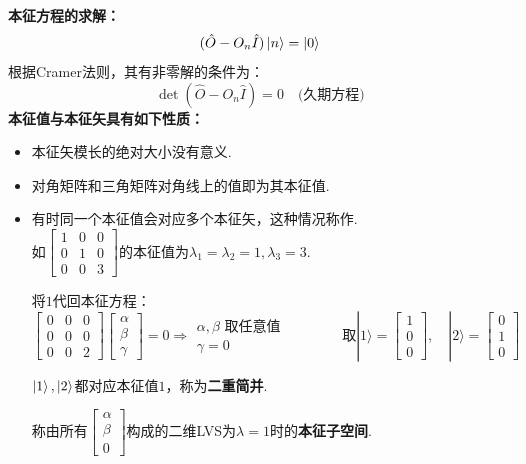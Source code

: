\noindent\textbf{本征方程的求解：}
\[(\hat{O}-O_n \hat{I}) \ket{n} = \ket{0}\]
根据Cramer法则，其有非零解的条件为：
\[\det(\hat{O}-O_n \hat{I})=0 \quad \text{(久期方程)}\]
\noindent\textbf{本征值与本征矢具有如下性质：}
\begin{itemize}
    \item 本征矢模长的绝对大小没有意义.
    \item 对角矩阵和三角矩阵对角线上的值即为其本征值.
    \item 有时同一个本征值会对应多个本征矢，这种情况称作.\\[1em]
    如$\begin{bmatrix} 1 & 0 & 0 \\ 0 & 1 & 0 \\ 0 & 0 & 3 \end{bmatrix}$的本征值为$\lambda_1 = \lambda_2 = 1, \lambda_3 = 3$.

    将$1$代回本征方程：
    \[
    \begin{bmatrix} 0 & 0 & 0 \\ 0 & 0 & 0 \\ 0 & 0 & 2 \end{bmatrix} \begin{bmatrix} \alpha \\ \beta \\ \gamma \end{bmatrix} = 0 \Rightarrow \begin{matrix} \alpha, \beta \text{ 取任意值} \\ \gamma = 0 \end{matrix}
    \qquad\qquad \text{取} |1\rangle = \begin{bmatrix} 1 \\ 0 \\ 0 \end{bmatrix}, \quad |2\rangle = \begin{bmatrix} 0 \\ 1 \\ 0 \end{bmatrix}
    \]

    $\ket{1},\ket{2}$都对应本征值$1$，称为\textbf{二重简并}.

    称由所有$\begin{bmatrix} \alpha \\ \beta \\ 0 \end{bmatrix}$构成的二维LVS为$\lambda = 1$时的\textbf{本征子空间}.
\end{itemize}

